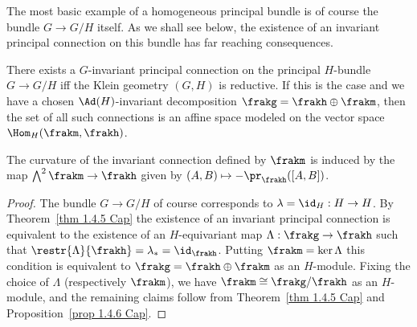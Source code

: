 The most basic example of a homogeneous principal bundle is of course the bundle $G\to G\slash H$ itself. As we shall see below, the existence of an invariant principal connection on this bundle has far reaching consequences.

\begin{cor}\label{cor 1.4.6 Cap}
    There exists a $G$-invariant principal connection on the principal $H$-bundle $G\to G\slash H$ iff the Klein geometry $(G,H)$ is reductive. If this is the case and we have a chosen $\Ad(H)$-invariant decomposition $\frakg=\frakh\oplus\frakm$, then the set of all such connections is an affine space modeled on the vector space $\Hom_H(\frakm,\frakh)$.

    The curvature of the invariant connection defined by $\frakm$ is induced by the map $\bigwedge^2\frakm\to\frakh$ given by $(A,B)\mapsto -\pr_\frakh([A,B])$.
\end{cor}
\begin{proof}
    The bundle $G\to G\slash H$ of course corresponds to $\lambda=\id_H:H\to H$. By Theorem~\ref{thm 1.4.5 Cap} the existence of an invariant principal connection is equivalent to the existence of an $H$-equivariant map $\Lambda:\frakg\to\frakh$ such that $\restr{\Lambda}{\frakh}=\lambda_\ast=\id_\frakh$. Putting $\frakm=\ker\Lambda$ this condition is equivalent to $\frakg=\frakh\oplus \frakm$ as an $H$-module. Fixing the choice of $\Lambda$ (respectively $\frakm$), we have $\frakm\cong \frakg\slash\frakh$ as an $H$-module, and the remaining claims follow from Theorem~\ref{thm 1.4.5 Cap} and Proposition~\ref{prop 1.4.6 Cap}.
\end{proof}


